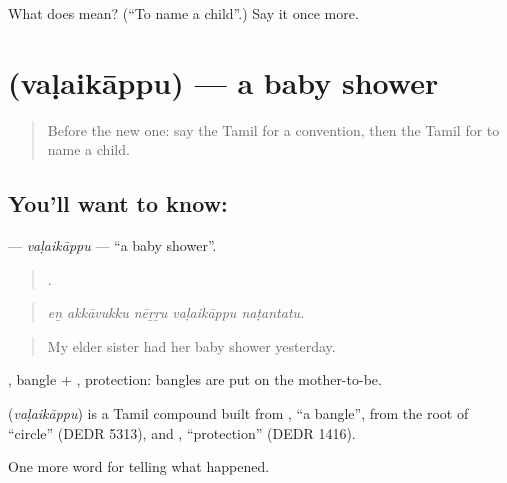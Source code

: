 \begin{tcolorbox}[breakable,colback=teal!4,colframe=teal!35!black,title={Before you move on}]
What does  mean? (\textquotedblleft{}To name a child\textquotedblright{}.) Say it once more.
\end{tcolorbox}
\section[\texorpdfstring{\ta{வளைகாப்பு} (vaḷaikāppu)}{வளைகாப்பு (vaḷaikāppu)}]{ (vaḷaikāppu) — a baby shower}

\label{lesson:TA-C321-valaikappu}



\begin{quote}
Before the new one: say the Tamil for a convention, then the Tamil for to name a child.
\end{quote}

\subsection*{You'll want to know: }
\textbf{} — \emph{vaḷaikāppu} — \textquotedblleft{}a baby shower\textquotedblright{}.

\begin{quote}
    .
\end{quote}

\begin{quote}
\emph{eṉ akkāvukku nēṟṟu vaḷaikāppu naṭantatu.}
\end{quote}

\begin{quote}
My elder sister had her baby shower yesterday.
\end{quote}

, bangle + , protection: bangles are put on the mother-to-be.

\begin{cousinweb}
\textbf{} (\emph{vaḷaikāppu}) is a Tamil compound built from , \textquotedblleft{}a bangle\textquotedblright{}, from the root of \textquotedblleft{}circle\textquotedblright{} (DEDR 5313), and , \textquotedblleft{}protection\textquotedblright{} (DEDR 1416).
\end{cousinweb}

\begin{grammarlens}[title={What you've built}]
One more word for telling what happened.
\end{grammarlens}

